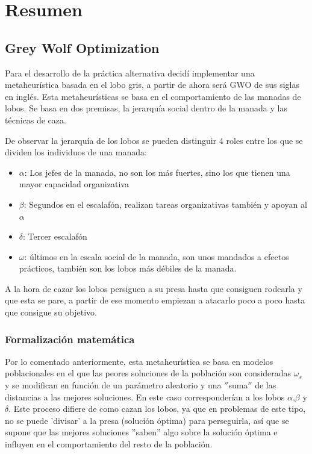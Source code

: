 \documentclass[a4paper, 12.5pt]{report}
\begin{document}
\tableofcontents


\section{Resumen}\label{sec:resumen}

\subsection{Grey Wolf Optimization}

Para el desarrollo de la práctica alternativa decidí implementar una metaheurística basada en el lobo gris, a partir de ahora será GWO de sus siglas en inglés. Esta metaheurísticas se basa en el comportamiento de las manadas de lobos. Se basa en dos premisas, la jerarquía social dentro de la manada y las técnicas de caza.

De observar la jerarquía de los lobos se pueden distinguir 4 roles entre los que se dividen los individuos de una manada:
\begin{itemize}
    \item $\alpha$: Los jefes de la manada, no son los más fuertes, sino los que tienen una mayor capacidad organizativa
    \item $\beta$: Segundos en el escalafón, realizan tareas organizativas también y apoyan al $\alpha$
    \item $\delta$: Tercer escalafón
    \item $\omega$: últimos en la escala social de la manada, son unos mandados a efectos prácticos, también son los lobos más débiles de la manada.
\end{itemize}


A la hora de cazar los lobos persiguen a su presa hasta que consiguen rodearla y que esta se pare, a partir de ese momento empiezan a atacarlo poco a poco hasta que consigue su objetivo.

\subsubsection{Formalización matemática}
Por lo comentado anteriormente, esta metaheurística se basa en modelos poblacionales en el que las peores soluciones de la población son consideradas $\omega_s$ y se modifican en función de un parámetro aleatorio y una \(''\)suma\(''\) de las distancias a las mejores soluciones. En este caso corresponderían a los lobos $\alpha$,$\beta$ y $\delta$. Este proceso difiere de como cazan los lobos, ya que en problemas de este tipo, no se puede 'divisar' a la presa (solución óptima) para perseguirla, así que se supone que las mejores soluciones ''saben'' algo sobre la solución óptima e influyen en el comportamiento del resto de la población.
\end{document}
